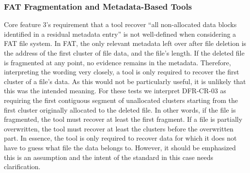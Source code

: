 \subsubsection{FAT Fragmentation and Metadata-Based Tools}
\begin{paraphrase}
Core feature 3's requirement that a tool recover ``all non-allocated data blocks identified in a residual metadata entry''\cite{meta:dfr:standards} is not well-defined when considering a FAT file system. 
In FAT, the only relevant metadata left over after file deletion is the address of the first cluster of file data, and the file's length. 
If the deleted file is fragmented at any point, no evidence remains in the metadata. 
Therefore, interpreting the wording very closely, a tool is only required to recover the first cluster of a file's data. 
As this would not be particularly useful, it is unlikely that this was the intended meaning. 
For these tests we interpret DFR-CR-03 as requiring the first contiguous segment of unallocated clusters starting from the first cluster originally allocated to the deleted file. 
In other words, if the file is fragmented, the tool must recover at least the first fragment. 
If a file is partially overwritten, the tool must recover at least the clusters before the overwritten part.
In essence, the tool is only required to recover data for which it does not have to guess what file the data belongs to.
However, it should be emphasized this is an assumption and the intent of the standard in this case needs clarification.
\end{paraphrase}


